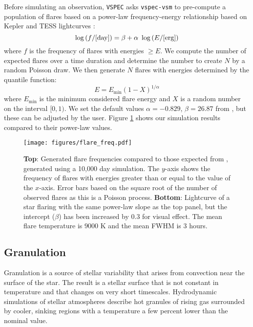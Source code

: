 \documentclass[twocolumn]{aastex631}
\newcommand{\vspec}[1]{\texttt{VSPEC}#1}
\begin{document}
Before simulating an observation, \vspec{} asks \texttt{vspec-vsm} to pre-compute a population of flares based on a power-law frequency-energy relationship based on Kepler and TESS lightcurves \citep{gao2022}:
\begin{equation} \label{eq:flare_freq}
    \log{(f/{\rm [day]})} = \beta + \alpha~\log{(E/{\rm [erg]})}
\end{equation}
where $f$ is the frequency of flares with energies $\ge E$. We compute the number of expected flares over a time duration and determine the number to create $N$ by a random Poisson draw. We then generate $N$ flares with energies determined by the quantile function:
\begin{equation}
    E = E_{\text{min}} (1-X)^{1/\alpha}
\end{equation}
where $E_{\text{min}}$ is the minimum considered flare energy and $X$ is a random number on the interval $[0,1)$. We set the default values $\alpha=-0.829$, $\beta=26.87$ from \citet{gao2022}, but these can be adjusted by the user. Figure \ref{fig:flare_freq} shows our simulation results compared to their power-law values.

\begin{figure}
    \centering
    \texttt{[image: figures/flare\_freq.pdf]}
    \caption{
        {\bf Top}: Generated flare frequencies compared to those expected from \citet{gao2022}, generated using a 10,000 day simulation. The $y$-axis shows the frequency of flares with energies greater than or equal to the value of the $x$-axis. Error bars based on the square root of the number of observed flares as this is a Poisson process. {\bf Bottom}: Lightcurve of a star flaring with the same power-law slope as the top panel, but the intercept ($\beta$) has been increased by 0.3 for visual effect. The mean flare temperature is $9000$ K and the mean FWHM is $3$ hours.
        }
    \label{fig:flare_freq}
\end{figure}

\subsection{Granulation}
Granulation is a source of stellar variability that arises from convection near the surface of the star. The result is a stellar surface that is not constant in temperature and that changes on very short timescales. Hydrodynamic simulations of stellar atmospheres \citep[e.g.][]{magic2014} describe hot granules of rising gas surrounded by cooler, sinking regions with a temperature a few percent lower than the nominal value. 
\end{document}
